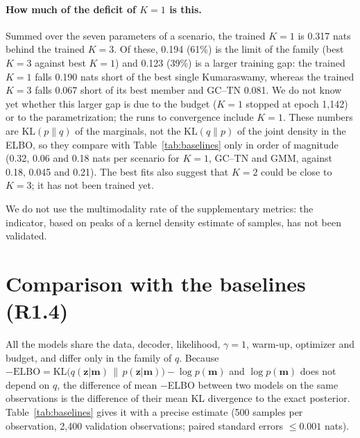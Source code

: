 \documentclass[11pt]{article}
\newcommand{\z}{\mathbf{z}}
\begin{document}
\paragraph{How much of the deficit of $K=1$ is this.} Summed over the seven parameters of a scenario, the trained $K=1$ is
0.317 nats behind the trained $K=3$. Of these, 0.194 (61\%) is the limit of the family (best $K=3$ against best $K=1$)
and 0.123 (39\%) is a larger training gap: the trained $K=1$ falls 0.190 nats short of the best single Kumaraswamy,
whereas the trained $K=3$ falls 0.067 short of its best member and GC--TN 0.081. We do not know yet whether this larger
gap is due to the budget ($K=1$ stopped at epoch 1,142) or to the parametrization; the runs to convergence include $K=1$.
These numbers are $\mathrm{KL}(p\|q)$ of the marginals, not the $\mathrm{KL}(q\|p)$ of the joint density in the ELBO, so
they compare with Table~\ref{tab:baselines} only in order of magnitude (0.32, 0.06 and 0.18 nats per scenario for $K=1$,
GC--TN and GMM, against 0.18, 0.045 and 0.21). The best fits also suggest that $K=2$ could be close to $K=3$; it has not been
trained yet.

We do not use the multimodality rate of the supplementary metrics: the indicator, based on peaks of a kernel density
estimate of samples, has not been validated.

\section{Comparison with the baselines (R1.4)}\label{sec:baselines}
All the models share the data, decoder, likelihood, $\gamma=1$, warm-up, optimizer and budget, and differ only in the
family of $q$. Because $-\mathrm{ELBO}=\mathrm{KL}\big(q(\z|\mathbf m)\,\|\,p(\z|\mathbf m)\big)-\log p(\mathbf m)$ and
$\log p(\mathbf m)$ does not depend on $q$, the difference of mean $-$ELBO between two models on the same observations is
the difference of their mean KL divergence to the exact posterior. Table~\ref{tab:baselines} gives it with a precise
estimate (500 samples per observation, 2,400 validation observations; paired standard errors $\le0.001$ nats).
\end{document}
